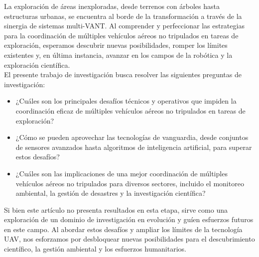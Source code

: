\documentclass[sigconf]{acmart}
\begin{document}
La exploración de áreas inexploradas, desde terrenos con árboles hasta estructuras urbanas, se encuentra al borde de la transformación a través de la sinergia de sistemas multi-VANT. Al comprender y perfeccionar las estrategias para la coordinación de múltiples vehículos aéreos no tripulados en tareas de exploración, esperamos descubrir nuevas posibilidades, romper los límites existentes y, en última instancia, avanzar en los campos de la robótica y la exploración científica.\\

El presente trabajo de investigación busca resolver las siguientes preguntas de investigación:

\begin{itemize}
  \item ¿Cuáles son los principales desafíos técnicos y operativos que impiden la coordinación eficaz de múltiples vehículos aéreos no tripulados en tareas de exploración?
  \item ¿Cómo se pueden aprovechar las tecnologías de vanguardia, desde conjuntos de sensores avanzados hasta algoritmos de inteligencia artificial, para superar estos desafíos?
  \item ¿Cuáles son las implicaciones de una mejor coordinación de múltiples vehículos aéreos no tripulados para diversos sectores, incluido el monitoreo ambiental, la gestión de desastres y la investigación científica?
\end{itemize}


Si bien este artículo no presenta resultados en esta etapa, sirve como una exploración de un dominio de investigación en evolución y guíen esfuerzos futuros en este campo. Al abordar estos desafíos y ampliar los límites de la tecnología UAV, nos esforzamos por desbloquear nuevas posibilidades para el descubrimiento científico, la gestión ambiental y los esfuerzos humanitarios.\\
\end{document}
